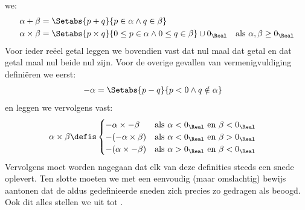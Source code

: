 \documentclass[../../../include/open-logic-section]{subfiles}
\begin{document}
we:
\begin{align*}
	\alpha + \beta &= \Setabs{p + q}{p \in \alpha \land q \in \beta}\\
	\alpha \times \beta &=
	\Setabs{p \times q}{0 \leq p \in \alpha \land 0 \leq q \in \beta} \cup 0_\Real & \text{als }\alpha, \beta \geq 0_\Real
\end{align*}
Voor ieder reëel getal leggen we bovendien vast dat nul maal dat getal
en dat getal maal nul beide nul zijn. Voor de overige gevallen van
vermenigvuldiging definiëren we eerst:
\begin{align*}
	-\alpha &= \Setabs{p - q}{p < 0 \land q \notin \alpha}
\end{align*}
en leggen we vervolgens vast:
\begin{align*}
	\alpha \times \beta &\defis
	\begin{cases}
		\mathord{-}\alpha \times \mathord{-}\beta &\text{als }\alpha < 0_\Real\text{ en }\beta < 0_\Real\\
		\mathord{-}(\mathord{-}\alpha \times \beta) &\text{als }\alpha < 0_\Real \text{ en }\beta > 0_\Real\\
		\mathord{-}(\alpha \times \mathord{-}\beta) &\text{als }\alpha > 0_\Real \text{ en }\beta < 0_\Real
	\end{cases}
\end{align*}
Vervolgens moet worden nagegaan dat elk van deze definities steeds een
snede oplevert. Ten slotte moeten we met een eenvoudig (maar omslachtig)
bewijs aantonen dat de aldus gedefinieerde sneden zich precies zo
gedragen als beoogd. Ook dit alles stellen we uit tot
.
\end{document}
